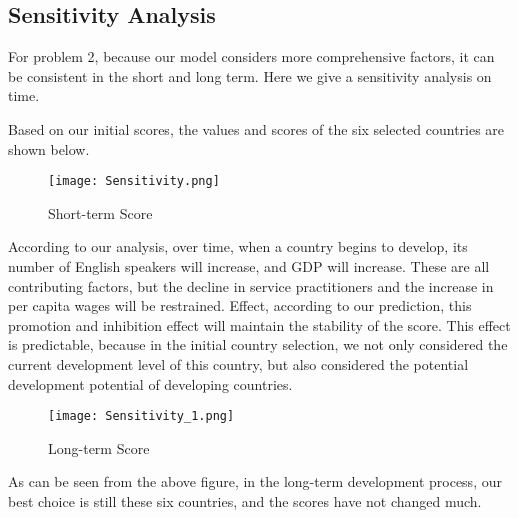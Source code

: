 \documentclass[12pt]{article}  %
\begin{document}
\subsection{Sensitivity Analysis}
For problem 2, because our model considers more comprehensive factors, it can be consistent in the short and long term. Here we give a sensitivity analysis on time.

Based on our initial scores, the values and scores of the six selected countries are shown below.

\begin{figure}[H]
	\centering
	\texttt{[image: Sensitivity.png]}
	\caption{Short-term Score}\label{fig:sensitivity}
\end{figure}

According to our analysis, over time, when a country begins to develop, its number of English speakers will increase, and GDP will increase. These are all contributing factors, but the decline in service practitioners and the increase in per capita wages will be restrained. Effect, according to our prediction, this promotion and inhibition effect will maintain the stability of the score. This effect is predictable, because in the initial country selection, we not only considered the current development level of this country, but also considered the potential development potential of developing countries.

\begin{figure}[H]
	\centering
	\texttt{[image: Sensitivity\_1.png]}
	\caption{Long-term Score}\label{fig:sensitivity_1}
\end{figure}

As can be seen from the above figure, in the long-term development process, our best choice is still these six countries, and the scores have not changed much.
\end{document}
